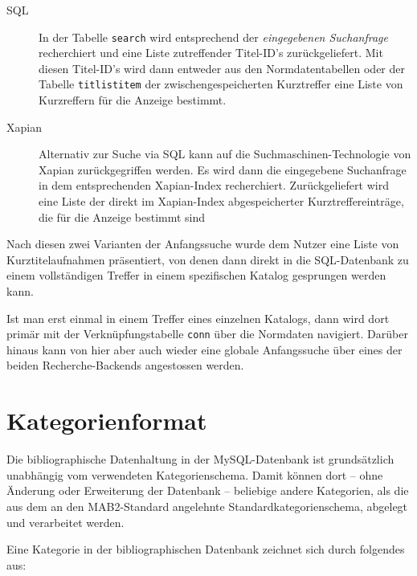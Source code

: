 \documentclass[11pt, twoside, a4paper, BCOR8mm, DIV12, bibtotoc,idxtotoc]{scrbook}
\begin{document}
\begin{description}
\item[SQL] In der Tabelle \texttt{search} wird entsprechend der
  \emph{eingegebenen Suchanfrage} recherchiert und eine Liste
  zutreffender Titel-ID's zurückgeliefert. Mit diesen Titel-ID's
  wird dann entweder aus den Normdatentabellen oder der Tabelle
  \texttt{titlistitem} der
  zwischengespeicherten Kurz\-treffer  eine Liste
  von Kurzreffern für die Anzeige bestimmt.
\item[Xapian] Alternativ zur Suche via SQL kann auf die
  Suchmaschinen-Technologie von Xapian zurückgegriffen werden. Es wird
  dann die eingegebene Suchanfrage in dem entsprechenden Xapian-Index
  recherchiert. Zurückgeliefert wird eine Liste der direkt im
  Xapian-Index abgespeicherter Kurztreffereinträge, die für die
  Anzeige bestimmt sind
\end{description}

Nach diesen zwei Varianten der Anfangssuche wurde dem Nutzer eine
Liste von Kurztitelaufnahmen präsentiert, von denen dann direkt in die
SQL-Datenbank zu einem vollständigen Treffer in einem spezifischen
Katalog gesprungen werden kann.

Ist man erst einmal in einem Treffer eines einzelnen Katalogs, dann
wird dort primär mit der Verknüpfungstabelle \texttt{conn} über die
Normdaten navigiert. Darüber hinaus kann von hier aber auch wieder eine
globale Anfangssuche über eines der beiden Recherche-Backends angestossen
werden.


\section{Kategorienformat}

Die bibliographische Datenhaltung in der MySQL-Datenbank ist
grundsätzlich unabhängig vom verwendeten Kategorienschema. Damit
können dort -- ohne Änderung oder Erweiterung der Datenbank --
beliebige andere Kategorien, als die aus dem an den MAB2-Standard angelehnte
Standardkategorien\-schema, abgelegt und verarbeitet werden.

Eine Kategorie in der bibliographischen Datenbank zeichnet sich durch
folgendes aus:
\end{document}
